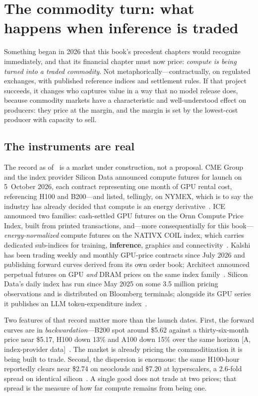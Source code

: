 \section{The commodity turn: what happens when inference is traded}
\label{sec:commodity}

Something began in 2026 that this book's precedent chapters would recognize immediately, and that its financial chapter must now price: \emph{compute is being turned into a traded commodity}. Not metaphorically---contractually, on regulated exchanges, with published reference indices and settlement rules. If that project succeeds, it changes who captures value in a way that no model release does, because commodity markets have a characteristic and well-understood effect on producers: they price at the margin, and the margin is set by the lowest-cost producer with capacity to sell.

\subsection{The instruments are real}

The record as of \datafreeze\ is a market under construction, not a proposal. CME Group and the index provider Silicon Data announced compute futures for launch on 5~October 2026, each contract representing one month of GPU rental cost, referencing H100 and B200---and listed, tellingly, on NYMEX, which is to say the industry has already decided that compute is an energy derivative~\cite{cme-compute}. ICE announced two families: cash-settled GPU futures on the Ornn Compute Price Index, built from printed transactions, and---more consequentially for this book---\emph{energy-normalized} compute futures on the NATIVX COIL index, which carries dedicated sub-indices for training, \textbf{inference}, graphics and connectivity~\cite{ice-ornn,ice-nativx}. Kalshi has been trading weekly and monthly GPU-price contracts since July 2026 and publishing forward curves derived from its own order book; Architect announced perpetual futures on GPU \emph{and} DRAM prices on the same index family~\cite{kalshi-compute,architect-futures}. Silicon Data's daily index has run since May 2025 on some 3.5 million pricing observations and is distributed on Bloomberg terminals; alongside its GPU series it publishes an LLM token-expenditure index~\cite{silicon-data}.

Two features of that record matter more than the launch dates. First, the forward curves are in \emph{backwardation}---B200 spot around \$5.62 against a thirty-six-month price near \$5.17, H100 down 13\% and A100 down 15\% over the same horizon [A, index-provider data]~\cite{silicon-data}. The market is already pricing the commoditization it is being built to trade. Second, the dispersion is enormous: the same H100-hour reportedly clears near \$2.74 on neoclouds and \$7.20 at hyperscalers, a 2.6-fold spread on identical silicon~\cite{silicon-data}. A single good does not trade at two prices; that spread is the measure of how far compute remains from being one.

